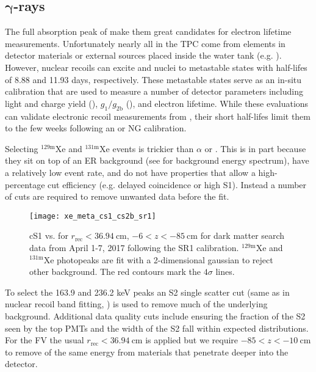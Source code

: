\subsection[$\gamma$-rays][$\gamma$-rays]{$\boldsymbol{\gamma}$-rays}
\label{subsec:electron_lifetimes_measurement_gammas}
The full absorption peak of \gammarays make them great candidates for electron lifetime measurements.  Unfortunately nearly all
\gammarays in the TPC come from elements in detector materials or external sources placed inside the water tank
(e.g. ).  However, nuclear recoils can excite  and  nuclei to metastable states with half-lifes
of 8.88 and 11.93 days, respectively.  These metastable states serve as an in-situ calibration that are used to measure a number of
detector parameters including light and charge yield (), $g_1/g_{2\mathrm{b}}$
(), and electron lifetime.  While these evaluations can validate
electronic recoil measurements from , their short half-lifes limit them to the few weeks following an \ambe or NG
calibration.

Selecting $\mathrm{^{129m}Xe}$ and $\mathrm{^{131m}Xe}$ events is trickier than $\alpha$ or .  This is in part because they
sit
on top of an ER background (see  for background energy spectrum), have a
relatively low event rate, and do not have properties that allow a high-percentage cut
efficiency (e.g.  delayed coincidence or high \alphadecay S1).  Instead a number of cuts are required
to remove unwanted data before the fit.

\begin{figure}
\centering
\texttt{[image: xe\_meta\_cs1\_cs2b\_sr1]}
\caption{cS1 vs. \cstwob for $r_{\mathrm{rec}} < 36.94\ \mathrm{cm}$, $-6 < z < -85\ \mathrm{cm}$ for dark matter search data from April
1-7, 2017 following the SR1 \ambe calibration.  $\mathrm{^{129m}Xe}$ and
$\mathrm{^{131m}Xe}$ photopeaks are fit with a 2-dimensional gaussian to reject other background.  The red contours mark
the $4\sigma$ lines.}
\label{fig:electron_lifetimes_measurement_gammas_cs1_cs2}
\end{figure}

To select the 163.9 and 236.2 keV peaks an S2 single scatter cut (same as in nuclear recoil band fitting,
) is used to remove much of the underlying background.  Additional data quality
cuts include ensuring the fraction of the S2 seen by the top PMTs and the width of the S2 fall within expected distributions.  For the FV
the usual $r_{\mathrm{rec}} < 36.94\ \mathrm{cm}$ is applied but we require $-85 < z < -10\ \mathrm{cm}$ to remove \gammarays of the same
energy from materials that penetrate deeper into the detector.


